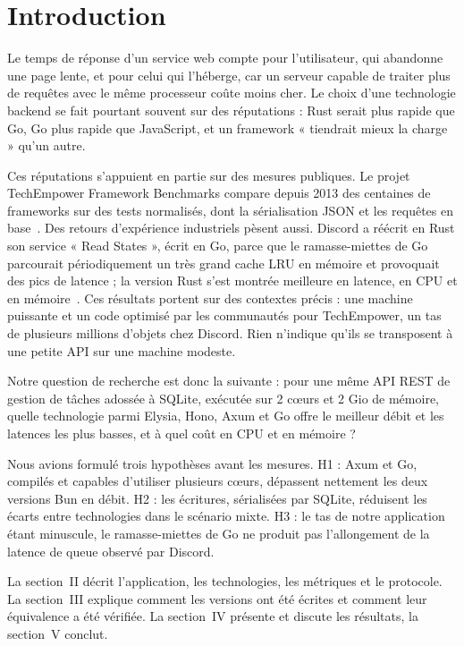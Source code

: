 \documentclass[conference,a4paper]{IEEEtran}
\begin{document}
\section{Introduction}
Le temps de réponse d'un service web compte pour l'utilisateur, qui
abandonne une page lente, et pour celui qui l'héberge, car un serveur
capable de traiter plus de requêtes avec le même processeur coûte moins
cher. Le choix d'une technologie backend se fait pourtant souvent sur
des réputations : Rust serait plus rapide que Go, Go plus rapide que
JavaScript, et un framework « tiendrait mieux la charge » qu'un autre.

Ces réputations s'appuient en partie sur des mesures publiques. Le projet
TechEmpower Framework Benchmarks compare depuis 2013 des centaines de
frameworks sur des tests normalisés, dont la sérialisation JSON et les
requêtes en base~\cite{techempower}. Des retours d'expérience industriels
pèsent aussi. Discord a réécrit en Rust son service « Read States »,
écrit en Go, parce que le ramasse-miettes de Go parcourait périodiquement
un très grand cache LRU en mémoire et provoquait des pics de latence ;
la version Rust s'est montrée meilleure en latence, en CPU et en
mémoire~\cite{discord}. Ces résultats portent sur des contextes précis :
une machine puissante et un code optimisé par les communautés pour
TechEmpower, un tas de plusieurs millions d'objets chez Discord. Rien
n'indique qu'ils se transposent à une petite API sur une machine modeste.

Notre question de recherche est donc la suivante : pour une même API REST
de gestion de tâches adossée à SQLite, exécutée sur 2 cœurs et 2 Gio de
mémoire, quelle technologie parmi Elysia, Hono, Axum et Go offre le
meilleur débit et les latences les plus basses, et à quel coût en CPU et
en mémoire ?

Nous avions formulé trois hypothèses avant les mesures.
H1 : Axum et Go, compilés et capables d'utiliser plusieurs cœurs,
dépassent nettement les deux versions Bun en débit.
H2 : les écritures, sérialisées par SQLite, réduisent les écarts entre
technologies dans le scénario mixte.
H3 : le tas de notre application étant minuscule, le ramasse-miettes de
Go ne produit pas l'allongement de la latence de queue observé par
Discord.

La section~II décrit l'application, les technologies, les métriques et
le protocole. La section~III explique comment les versions ont été
écrites et comment leur équivalence a été vérifiée. La section~IV
présente et discute les résultats, la section~V conclut.
\end{document}
